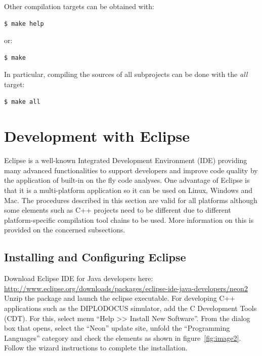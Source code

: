\documentclass[12pt]{article}
\begin{document}
Other compilation targets can be obtained with:
\begin{verbatim}
$ make help
\end{verbatim}
or:
\begin{verbatim}
$ make
\end{verbatim}
In particular, compiling the sources of all subprojects can be done with the
\textit{all} target:
  \begin{verbatim}
$ make all
\end{verbatim}



\section{Development with Eclipse}

Eclipse is a well-known Integrated Development Environment (IDE) providing many advanced functionalities to support developers and improve code quality by the application of built-in on the fly code analyses. One advantage of Eclipse is that it is a multi-platform application so it can be used on Linux, Windows and Mac. The procedures described in this section are valid for all platforms although some elements such as C++ projects need to be different due to different platform-specific compilation tool chains to be used. More information on this is provided on the concerned subsections. \\

\subsection{Installing and Configuring Eclipse}

Download Eclipse IDE for Java developers here: \\
\url{http://www.eclipse.org/downloads/packages/eclipse-ide-java-developers/neon2}
\\

Unzip the package and launch the eclipse executable. For developing C++
applications such as the DIPLODOCUS simulator, add the C Development Tools
(CDT). For this, select menu ``Help >> Install New Software''.
From the dialog box that opens, select the ``Neon'' update site, unfold the
``Programming Languages'' category and check the elements as shown in
figure~\ref{fig:image2}. Follow the wizard instructions to complete the
installation.
\end{document}

